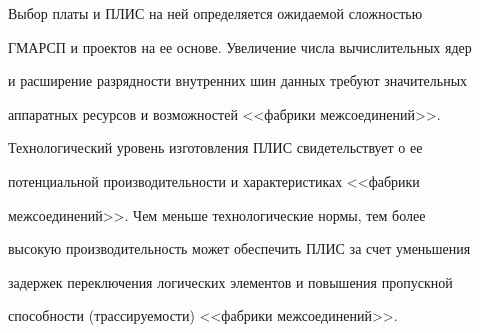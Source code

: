   Выбор платы и ПЛИС на ней определяется ожидаемой сложностью 

ГМАРСП и проектов на ее основе. Увеличение числа вычислительных ядер 

и расширение разрядности внутренних шин данных требуют значительных 

аппаратных ресурсов и возможностей <<фабрики межсоединений>>.

  

   Технологический уровень изготовления ПЛИС свидетельствует о ее 

потенциальной производительности и характеристиках <<фабрики 

межсоединений>>. Чем меньше технологические нормы, тем более 

высокую производительность может обеспечить ПЛИС за счет уменьшения 

задержек переключения логических элементов и повышения пропускной 

способности (трассируемости) <<фабрики межсоединений>>.

  


